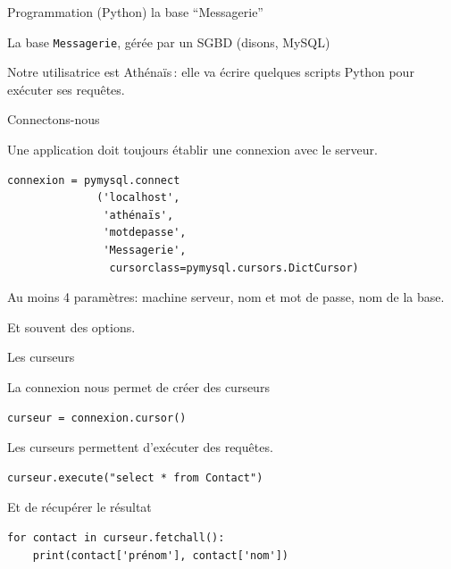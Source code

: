 

\begin{frame}{Programmation (Python) la base ``Messagerie''}

La base \texttt{Messagerie}, gérée par un 
SGBD (disons, MySQL)

\vfill


\vfill

Notre utilisatrice est Athénaïs\,: elle va écrire quelques
scripts Python pour exécuter ses requêtes.
\end{frame}

\begin{frame}[fragile]{Connectons-nous}

Une application doit toujours établir une connexion
avec le serveur.

\vfill

\begin{verbatim}
connexion = pymysql.connect
              ('localhost', 
               'athénaïs', 
               'motdepasse', 
               'Messagerie',
                cursorclass=pymysql.cursors.DictCursor)
\end{verbatim}

\vfill

Au moins 4 paramètres: machine serveur, nom et mot de passe, nom de la base.

\vfill

Et souvent des options.

\end{frame}


\begin{frame}[fragile]{Les curseurs}

La connexion nous permet de créer des \alert{curseurs}

\begin{verbatim}
curseur = connexion.cursor()
\end{verbatim}
\vfill

Les curseurs permettent d'exécuter des requêtes.

\vfill

\begin{verbatim}
curseur.execute("select * from Contact")
\end{verbatim}

\vfill

Et de récupérer le résultat

\vfill

\begin{verbatim}
for contact in curseur.fetchall():
    print(contact['prénom'], contact['nom'])
\end{verbatim}
\end{frame}


